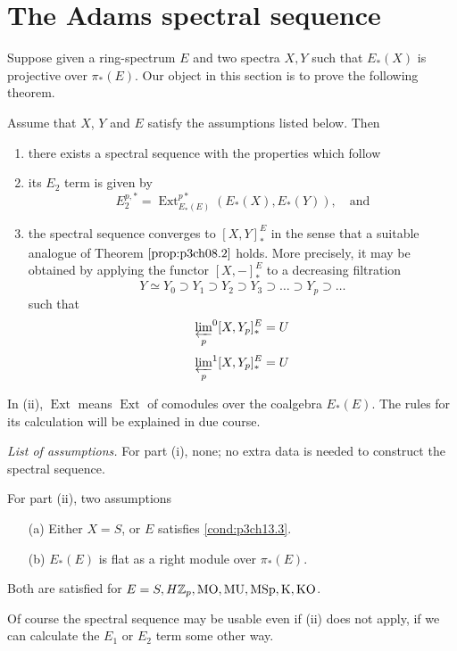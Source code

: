 \documentclass[../main]{subfiles}
\begin{document}
\chapter{The Adams spectral sequence}
\label{sec:p3c15}
Suppose given a ring-spectrum $E$ and two spectra $X,Y$ such that $E_\ast(X)$ is projective over $\pi_\ast(E)$. Our object in this section is to prove the following theorem. 

\begin{theorem}\label{thm:p3ch15.1}
Assume that $X$, $Y$ and $E$ satisfy the assumptions listed below. Then
\begin{enumerate}[label=(\roman*)]
    \item there exists a spectral sequence with the properties which follow
    \item its $E_2$ term is given by 
    \[E_2^{p,\ast}=\operatorname{Ext}_{E_\ast(E)}^{p\ast}(E_\ast(X),E_\ast(Y)), \quad \text{and}\]
    \item the spectral sequence converges to $[X,Y]_\ast^E$ in the sense that a suitable analogue of Theorem $\ref{prop:p3ch08.2}$ holds. More precisely, it may be obtained by applying the functor $[X,-]_\ast^E$ to a decreasing filtration
    \[Y\simeq Y_0\supset Y_1\supset Y_2\supset Y_3 \supset \hdots \supset Y_p\supset \hdots\]
    such that 
    \[{\varprojlim_p}^0[X,Y_p]_\ast^E=U\]
    \[{\varprojlim_p}^1[X,Y_p]_\ast^E=U\]
\end{enumerate}
\end{theorem}
\begin{notes}
In (ii), $\operatorname{Ext}$ means $\operatorname{Ext}$ of comodules over the coalgebra $E_\ast(E)$. The rules for its calculation will be explained in due course.
\end{notes}
\par \emph{List of assumptions.} For part (i), none; no extra data is needed to construct the spectral sequence.

For part (ii), two assumptions
\begin{enumerate}
    \item[(a)] Either $X=S$, or $E$ satisfies \ref{cond:p3ch13.3}.
    \item[(b)] $E_\ast(E)$ is flat as a right module over $\pi_\ast(E)$.
\end{enumerate}
Both are satisfied for $E=S, H\mathbb{Z}_p, \mathrm{MO, MU, MSp, K, KO}$.

Of course the spectral sequence may be usable even if (ii) does not apply, if we can calculate the $E_1$ or $E_2$ term some other way.
\end{document}
